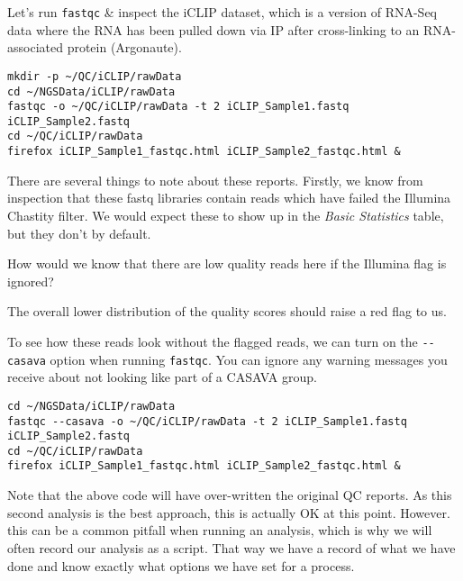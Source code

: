 Let's run \texttt{fastqc} \& inspect the iCLIP dataset, which is a version of RNA-Seq data where the RNA has been pulled down via IP after cross-linking to an RNA-associated protein (Argonaute).

\begin{lstlisting}
mkdir -p ~/QC/iCLIP/rawData
cd ~/NGSData/iCLIP/rawData
fastqc -o ~/QC/iCLIP/rawData -t 2 iCLIP_Sample1.fastq iCLIP_Sample2.fastq
cd ~/QC/iCLIP/rawData
firefox iCLIP_Sample1_fastqc.html iCLIP_Sample2_fastqc.html &
\end{lstlisting}

There are several things to note about these reports.
Firstly, we know from inspection that these fastq libraries contain reads which have failed the Illumina Chastity filter.
We would expect these to show up in the \textit{Basic Statistics} table, but they don't by default.

\begin{questions}
How would we know that there are low quality reads here if the Illumina flag is ignored?\\
\begin{answer}
The overall lower distribution of the quality scores should raise a red flag to us. \\
\end{answer}
\end{questions}

To see how these reads look without the flagged reads, we can turn on the \texttt{-{}-casava} option when running \texttt{fastqc}.
You can ignore any warning messages you receive about not looking like part of a CASAVA group.

\begin{lstlisting}
cd ~/NGSData/iCLIP/rawData
fastqc --casava -o ~/QC/iCLIP/rawData -t 2 iCLIP_Sample1.fastq iCLIP_Sample2.fastq
cd ~/QC/iCLIP/rawData
firefox iCLIP_Sample1_fastqc.html iCLIP_Sample2_fastqc.html &
\end{lstlisting}

\begin{information}
Note that the above code will have over-written the original QC reports.
As this second analysis is the best approach, this is actually OK at this point.
However. this can be a common pitfall when running an analysis, which is why we will often record our analysis as a script.
That way we have a record of what we have done and know exactly what options we have set for a process.
\end{information}


